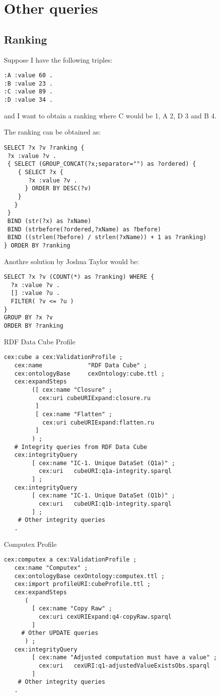 \section{Other queries}

\subsection{Ranking}
Suppose I have the following triples:

\begin{lstlisting}[style=SPARQL]
:A :value 60 .
:B :value 23 .
:C :value 89 .
:D :value 34 .
\end{lstlisting}

and I want to obtain a ranking where C would be 1, A 2, D 3 and B 4.

The ranking can be obtained as:

\begin{lstlisting}[style=SPARQL]
SELECT ?x ?v ?ranking { 
 ?x :value ?v .
 { SELECT (GROUP_CONCAT(?x;separator="") as ?ordered) {
    { SELECT ?x {
       ?x :value ?v .
      } ORDER BY DESC(?v)
    }
   }
 }
 BIND (str(?x) as ?xName)
 BIND (strbefore(?ordered,?xName) as ?before) 
 BIND ((strlen(?before) / strlen(?xName)) + 1 as ?ranking)
} ORDER BY ?ranking
\end{lstlisting}

Anothre solution by Joshua Taylor would be:

\begin{lstlisting}[style=SPARQL]
SELECT ?x ?v (COUNT(*) as ?ranking) WHERE {
  ?x :value ?v .
  [] :value ?u .
  FILTER( ?v <= ?u )
}
GROUP BY ?x ?v
ORDER BY ?ranking
\end{lstlisting}

RDF Data Cube Profile

\begin{lstlisting}[style=SPARQL]
cex:cube a cex:ValidationProfile ;
   cex:name 			"RDF Data Cube" ;
   cex:ontologyBase 	cexOntology:cube.ttl ;
   cex:expandSteps 
	 	([ cex:name "Closure" ; 
          cex:uri cubeURIExpand:closure.ru  
         ]
	 	 [ cex:name "Flatten" ; 
	 	   cex:uri cubeURIExpand:flatten.ru 
	 	 ] 
        ) ;
   # Integrity queries from RDF Data Cube
   cex:integrityQuery 
	    [ cex:name "IC-1. Unique DataSet (Q1a)" ;
	      cex:uri	cubeURI:q1a-integrity.sparql 
	    ] ;
   cex:integrityQuery 
	    [ cex:name "IC-1. Unique DataSet (Q1b)" ;
	      cex:uri	cubeURI:q1b-integrity.sparql 
	    ] ;
	# Other integrity queries
   .
\end{lstlisting}

Computex Profile

\begin{lstlisting}[style=SPARQL]
cex:computex a cex:ValidationProfile ;
   cex:name "Computex" ;
   cex:ontologyBase cexOntology:computex.ttl ;
   cex:import profileURI:cubeProfile.ttl ;
   cex:expandSteps 
      ( 
		[ cex:name "Copy Raw" ; 
	 	  cex:uri cexURIExpand:q4-copyRaw.sparql 
	 	]         
	 # Other UPDATE queries
	  ) ;
   cex:integrityQuery 
	    [ cex:name "Adjusted computation must have a value" ;
	      cex:uri	cexURI:q1-adjustedValueExistsObs.sparql 
	    ] 
	# Other integrity queries
   .
\end{lstlisting}
